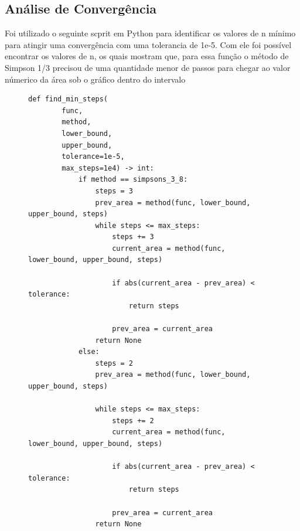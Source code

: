 \documentclass{article}
\begin{document}
\subsection*{Análise de Convergência}
Foi utilizado o seguinte scprit em Python para identificar os valores de n mínimo para atingir uma convergência com uma tolerancia de 1e-5. Com ele foi possível encontrar os valores de n, os quais mostram que, para essa função o método de Simpson 1/3 precisou de uma quantidade menor de passos para chegar ao valor númerico da área sob o gráfico dentro do intervalo
\begin{figure}[H]
    \begin{lstlisting}[caption={Função para encontrar o número mínimo de passos para convergência.}, label={lst:find_steps}]
        def find_min_steps(
        func, 
        method, 
        lower_bound, 
        upper_bound, 
        tolerance=1e-5, 
        max_steps=1e4) -> int:
            if method == simpsons_3_8:
                steps = 3
                prev_area = method(func, lower_bound, upper_bound, steps)
                while steps <= max_steps:
                    steps += 3
                    current_area = method(func, lower_bound, upper_bound, steps)
                    
                    if abs(current_area - prev_area) < tolerance:
                        return steps
                    
                    prev_area = current_area
                return None
            else:
                steps = 2
                prev_area = method(func, lower_bound, upper_bound, steps)
                
                while steps <= max_steps:
                    steps += 2
                    current_area = method(func, lower_bound, upper_bound, steps)
                    
                    if abs(current_area - prev_area) < tolerance:
                        return steps
                    
                    prev_area = current_area
                return None
    \end{lstlisting}
\end{figure}
\end{document}

